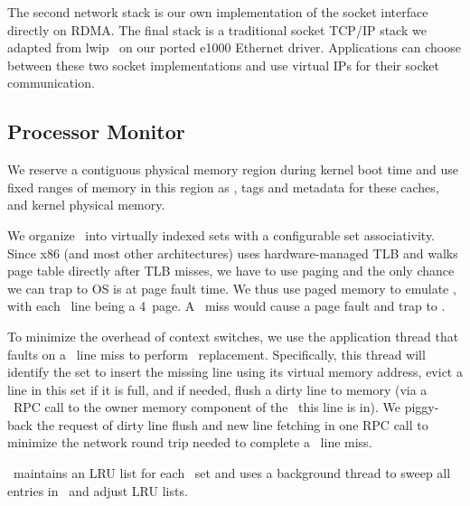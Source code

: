 \documentclass[10pt,times,twocolumn]{z2-article}
\begin{document}
{{{{{{{The second network stack is our own implementation of the socket interface directly on RDMA.
The final stack is a traditional socket TCP/IP stack we adapted from lwip~\cite{lwip} 
on our ported e1000 Ethernet driver.
Applications can choose between these two socket implementations 
and use virtual IPs for their socket communication.

\subsection{Processor Monitor}
\label{sec:procimpl}

We reserve a contiguous physical memory region during kernel boot time
and use fixed ranges of memory in this region as \excache, tags and metadata for these caches, and kernel physical memory. 

We organize \excache\ into virtually indexed sets with a configurable set associativity.
Since x86 (and most other architectures) uses hardware-managed TLB and walks page table directly after TLB misses, 
we have to use paging and the only chance we can trap to OS is at page fault time. 
We thus use paged memory to emulate \excache, 
with each \excache\ line being a 4\KB\ page.
A \excache\ miss would cause a page fault and trap to \lego.

To minimize the overhead of context switches,
we use the application thread that faults on a \excache\ line miss
to perform \excache\ replacement.
Specifically, this thread will identify the set to insert the missing line
using its virtual memory address,
evict a line in this set if it is full,
and if needed, flush a dirty line to memory 
(via a \lego\ RPC call to the owner memory component of the \vregion\ this line is in).
We piggy-back the request of dirty line flush and new line fetching
in one RPC call to minimize the network round trip needed to complete a \excache\ line miss.

\lego\ maintains an LRU list for each \excache\ set 
and uses a background thread to sweep all entries in \excache\ and adjust LRU lists.

}}}}}}}
\end{document}
